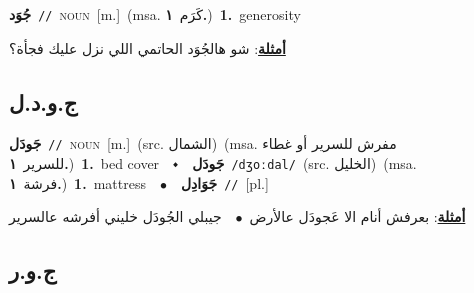 \documentclass[10pt,a4paper,twoside]{article} %
\begin{document}
\begin{multicols}{2}
{\setlength\topsep{0pt}\textbf{\foreignlanguage{arabic}{جُوَد}}\ {\color{gray}\texttt{//}\color{black}}\ \textsc{noun}\ [m.]\ \color{gray}(msa. \foreignlanguage{arabic}{كَرَم}~\foreignlanguage{arabic}{\textbf{١.}})\color{black}\ \textbf{1.}~generosity\  \begin{flushright}\color{gray}\foreignlanguage{arabic}{\textbf{\underline{\foreignlanguage{arabic}{أمثلة}}}: شو هالجُوَد الحاتمي اللي نزل عليك فجأة؟}\end{flushright}\color{black}} \vspace{2mm}

\vspace{-3mm}
\subsection*{\color{blue}\foreignlanguage{arabic}{ج.و.د.ل}\color{blue}{}} 

{\setlength\topsep{0pt}\textbf{\foreignlanguage{arabic}{جَودَل}}\ {\color{gray}\texttt{//}\color{black}}\ \textsc{noun}\ [m.]\ (src. \color{gray}\foreignlanguage{arabic}{الشمال}\color{black})\ \color{gray}(msa. \foreignlanguage{arabic}{مفرش للسرير أو غطاء للسرير}~\foreignlanguage{arabic}{\textbf{١.}})\color{black}\ \textbf{1.}~bed cover\ \ $\smblkdiamond$\ \ \setlength\topsep{0pt}\textbf{\foreignlanguage{arabic}{جَودَل}}\ {\color{gray}\texttt{/dʒoːdal/}\color{black}}\ (src. \color{gray}\foreignlanguage{arabic}{الخليل}\color{black})\ \color{gray}(msa. \foreignlanguage{arabic}{فرشة}~\foreignlanguage{arabic}{\textbf{١.}})\color{black}\ \textbf{1.}~mattress\ \ $\bullet$\ \ \setlength\topsep{0pt}\textbf{\foreignlanguage{arabic}{جَوَادِل}}\ {\color{gray}\texttt{//}\color{black}}\ [pl.]\  \begin{flushright}\color{gray}\foreignlanguage{arabic}{\textbf{\underline{\foreignlanguage{arabic}{أمثلة}}}: بعرفش أنام الا عَجودَل عالأرض\ $\bullet$\ \  جيبلي الجُودَل خليني أفرشه عالسرير}\end{flushright}\color{black}} \vspace{2mm}

\vspace{-3mm}
\subsection*{\color{blue}\foreignlanguage{arabic}{ج.و.ر}\color{blue}{}} 


\end{multicols}
\end{document}
